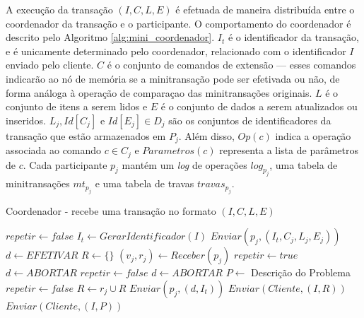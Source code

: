 \documentclass[11pt,twoside,a4paper]{book}
\begin{document}
A execução da transação $(I, C, L, E)$ é efetuada de maneira distribuída entre o coordenador da transação e o participante. O comportamento do coordenador é descrito pelo Algoritmo \ref{alg:mini_coordenador}. $I_t$ é o identificador da transação, e é unicamente determinado pelo coordenador, relacionado com o identificador $I$ enviado pelo cliente. $C$ é o conjunto de comandos de extensão --- esses comandos indicarão ao nó de memória se a minitransação pode ser efetivada ou não, de forma análoga à operação de comparaçao das minitransações originais. $L$ é o conjunto de itens a serem lidos e $E$ é o conjunto de dados a serem atualizados ou inseridos. $L_j, Id[C_j]\text{ e } Id[E_j] \in D_j$ são os conjuntos de identificadores da transação que estão armazenados em $P_j$. Além disso, $Op(c)$ indica a operação associada ao comando $c \in C_j$ e $Parametros(c)$ representa a lista de parâmetros de $c$. Cada participante $p_j$ mantém um \emph{log} de operações $log_{p_j}$, uma tabela de minitransações $mt_{p_j}$ e uma tabela de travas $travas_{p_j}$.

\begin{algorithm}
    \caption{Coordenador - recebe uma transação no formato $(I, C, L, E)$}
    \label{alg:mini_coordenador}
    \begin{algorithmic}[1]
        \State $repetir \gets false$
        \Repeat
            \State $I_t \gets GerarIdentificador(I)$
                \State $Enviar(p_j, (I_t, C_j, L_j, E_j))$
            \EndFor
            \State $d \gets EFETIVAR$
            \State $R \gets \{\}$
                \State $(v_j, r_j) \gets Receber(p_j)$
                    \State $repetir \gets true$
                    \State $d \gets ABORTAR$
                    \State $repetir \gets false$
                    \State $d \gets ABORTAR$
                    \State $P \gets$ Descrição do Problema
                \Else 
                    \State $repetir \gets false$
                    \State $R \gets r_j \cup R$
                \EndIf
            \EndFor
                \State $Enviar(p_j, (d, I_t))$
            \EndFor
            \State $Enviar(Cliente, (I, R))$
        \Else
            \State $Enviar(Cliente, (I, P))$
        \EndIf
    \end{algorithmic}
\end{algorithm}
\end{document}
